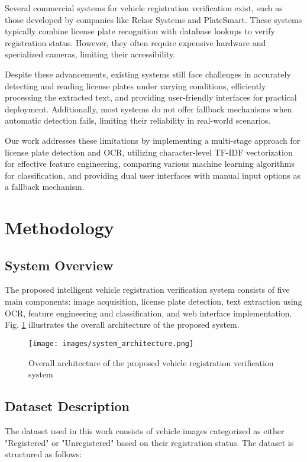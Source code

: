 \documentclass[conference]{IEEEtran}
\newcounter{Method}
\begin{document}
Several commercial systems for vehicle registration verification exist, such as those developed by companies like Rekor Systems and PlateSmart. These systems typically combine license plate recognition with database lookups to verify registration status. However, they often require expensive hardware and specialized cameras, limiting their accessibility.

Despite these advancements, existing systems still face challenges in accurately detecting and reading license plates under varying conditions, efficiently processing the extracted text, and providing user-friendly interfaces for practical deployment. Additionally, most systems do not offer fallback mechanisms when automatic detection fails, limiting their reliability in real-world scenarios.

Our work addresses these limitations by implementing a multi-stage approach for license plate detection and OCR, utilizing character-level TF-IDF vectorization for effective feature engineering, comparing various machine learning algorithms for classification, and providing dual user interfaces with manual input options as a fallback mechanism.

\section{Methodology}

\subsection{System Overview}
The proposed intelligent vehicle registration verification system consists of five main components: image acquisition, license plate detection, text extraction using OCR, feature engineering and classification, and web interface implementation. Fig. \ref{fig:system_overview} illustrates the overall architecture of the proposed system.

\begin{figure}[h]
\centering
\texttt{[image: images/system\_architecture.png]}
\caption{Overall architecture of the proposed vehicle registration verification system}
\label{fig:system_overview}
\end{figure}

\subsection{Dataset Description}
The dataset used in this work consists of vehicle images categorized as either "Registered" or "Unregistered" based on their registration status. The dataset is structured as follows:
\end{document}
